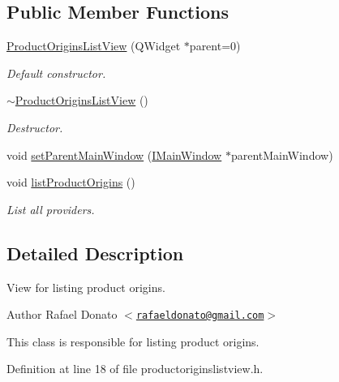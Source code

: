 \subsection*{\-Public \-Member \-Functions}
\begin{DoxyCompactItemize}
\item 
\hyperlink{class_product_origins_list_view_ae491807bf2f0b05a33ef39b8504e7e59}{\-Product\-Origins\-List\-View} (\-Q\-Widget $\ast$parent=0)
\begin{DoxyCompactList}\small\item\em \-Default constructor. \end{DoxyCompactList}\item 
\hyperlink{class_product_origins_list_view_adcc06d50ac99be367b592003dd55245d}{$\sim$\-Product\-Origins\-List\-View} ()
\begin{DoxyCompactList}\small\item\em \-Destructor. \end{DoxyCompactList}\item 
void \hyperlink{class_product_origins_list_view_ab03a9dfe4b99f7441c38a72e34295366}{set\-Parent\-Main\-Window} (\hyperlink{class_i_main_window}{\-I\-Main\-Window} $\ast$parent\-Main\-Window)
\item 
void \hyperlink{class_product_origins_list_view_a5b1ff89a0392149eb00bcc4a84828a5c}{list\-Product\-Origins} ()
\begin{DoxyCompactList}\small\item\em \-List all providers. \end{DoxyCompactList}\end{DoxyCompactItemize}


\subsection{\-Detailed \-Description}
\-View for listing product origins. 

\begin{DoxyAuthor}{\-Author}
\-Rafael \-Donato $<$\href{mailto:rafaeldonato@gmail.com}{\tt rafaeldonato@gmail.\-com}$>$
\end{DoxyAuthor}
\-This class is responsible for listing product origins. 

\-Definition at line 18 of file productoriginslistview.\-h.



